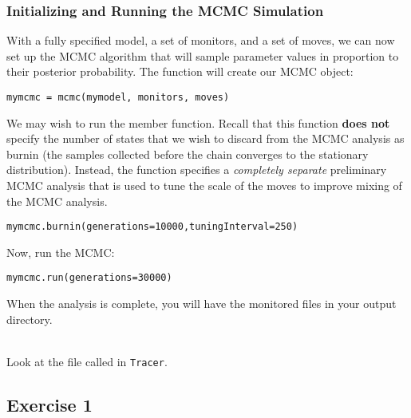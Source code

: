 \subsubsection{Initializing and Running the MCMC Simulation}

With a fully specified model, a set of monitors, and a set of moves, we can now set up the MCMC algorithm that will sample parameter values in proportion to their posterior probability. The  function will create our MCMC object:
{\tt \begin{snugshade*}
\begin{lstlisting}
mymcmc = mcmc(mymodel, monitors, moves)
\end{lstlisting}
\end{snugshade*}}


We may wish to run the  member function.
Recall that this function \textbf{does not} specify the number of states that we wish to discard from the MCMC analysis as burnin (\IE the samples collected before the chain converges to the stationary distribution).  
Instead, the  function specifies a \textit{completely separate} preliminary MCMC analysis that is used to tune the scale of the moves to improve mixing of the MCMC analysis.
{\tt \begin{snugshade*}
\begin{lstlisting}
mymcmc.burnin(generations=10000,tuningInterval=250)
\end{lstlisting}
\end{snugshade*}}


Now, run the MCMC:
{\tt \begin{snugshade*}
\begin{lstlisting}
mymcmc.run(generations=30000)
\end{lstlisting}
\end{snugshade*}}

When the analysis is complete, you will have the monitored files in your output directory.

\noindent \\ \impmark Look at the file called  in \texttt{Tracer}.


\subsection{Exercise 1}

